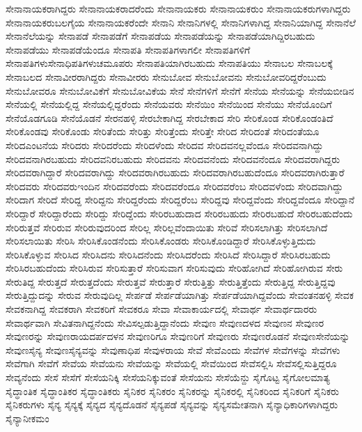 {ಸೇನಾನಾಯಕರಾಗಿದ್ದರು
ಸೇನಾನಾಯಕರಾದರೆಂದು
ಸೇನಾನಾಯಕರು
ಸೇನಾನಾಯಕರುಂ
ಸೇನಾನಾಯಕರುಗಳಾಗಿದ್ದರು
ಸೇನಾನಾಯಕರುಬಲಗೈಯ
ಸೇನಾನಾಯಕರೆಂದೇ
ಸೇನಾನಿ
ಸೇನಾನಿಗಳಲ್ಲಿ
ಸೇನಾನಿಗಳಾಗಿದ್ದ
ಸೇನಾನಿಯಾಗಿದ್ದ
ಸೇನಾನೆಲೆ
ಸೇನಾನೆಲೆಯನ್ನು
ಸೇನಾಪಡೆ
ಸೇನಾಪಡೆಗೆ
ಸೇನಾಪಡೆಯ
ಸೇನಾಪಡೆಯನ್ನು
ಸೇನಾಪಡೆಯಾಗಿದ್ದಿರಬಹುದು
ಸೇನಾಪಡೆಯು
ಸೇನಾಪಡೆಯೆಂದೂ
ಸೇನಾಪತಿ
ಸೇನಾಪತಿಗಳಾಗಲೀ
ಸೇನಾಪತಿಗಳಿಗೆ
ಸೇನಾಪತಿಗಳುಸೇನಾಧಿಪತಿಗಳುಚಮೂಪರು
ಸೇನಾಪತಿಯಾಗಿರಬಹುದು
ಸೇನಾಪತಿಯು
ಸೇನಾಬಲ
ಸೇನಾಬಲಕ್ಕೆ
ಸೇನಾಬಲದ
ಸೇನಾವೀರರಾಗಿದ್ದರು
ಸೇನಾವೀರರು
ಸೇನುಬೋವ
ಸೇನುಬೋವನು
ಸೇನುಬೋವರಿದ್ದರೆಂಬುದು
ಸೇನುಬೋವರೂ
ಸೇನುಬೋವಿಕೆಗೆ
ಸೇನುಬೋವಿಕೆಯ
ಸೇನೆ
ಸೇನೆಗಳಿಗೆ
ಸೇನೆಗೆ
ಸೇನೆಯ
ಸೇನೆಯನ್ನು
ಸೇನೆಯಬೀಡಿನ
ಸೇನೆಯಲ್ಲಿ
ಸೇನೆಯಲ್ಲಿದ್ದ
ಸೇನೆಯಲ್ಲಿದ್ದರೆಂದು
ಸೇನೆಯವರು
ಸೇನೆಯಿಂ
ಸೇನೆಯಿಂದ
ಸೇನೆಯು
ಸೇನೆಯೊಂದಿಗೆ
ಸೇನೆಯೊಡಗೂಡಿ
ಸೇನೆಯೊಡನೆ
ಸೇರನಹಳ್ಳಿ
ಸೇರಬೇಕಾಗಿದ್ದ
ಸೇರಬೇಕಾದ
ಸೇರಿ
ಸೇರಿಕೊಂಡ
ಸೇರಿಕೊಂಡಂತಿದೆ
ಸೇರಿಕೊಂಡವು
ಸೇರಿಕೊಂಡು
ಸೇರಿತೆಂದು
ಸೇರಿತ್ತು
ಸೇರಿತ್ತೆಂದು
ಸೇರಿತ್ತೇ
ಸೇರಿದ
ಸೇರಿದಂತೆ
ಸೇರಿದಂತೆಯೂ
ಸೇರಿದಎಂಟನೆಯ
ಸೇರಿದರು
ಸೇರಿದರೆಂದು
ಸೇರಿದಳೆಂದು
ಸೇರಿದವ
ಸೇರಿದವನಲ್ಲವೆಂದೂ
ಸೇರಿದವನಾಗಿದ್ದು
ಸೇರಿದವನಾಗಿರಬಹುದು
ಸೇರಿದವನಿರಬಹುದು
ಸೇರಿದವನು
ಸೇರಿದವನೆಂದು
ಸೇರಿದವನೆಂದೂ
ಸೇರಿದವರಾಗಿದ್ದರು
ಸೇರಿದವರಾಗಿದ್ದಾರೆ
ಸೇರಿದವರಾಗಿದ್ದು
ಸೇರಿದವರಾಗಿರಬಹುದು
ಸೇರಿದವರಾಗಿರಬಹುದೆಂದೂ
ಸೇರಿದವರಾಗಿರುತ್ತಾರೆ
ಸೇರಿದವರು
ಸೇರಿದವರುಇಂದಿನ
ಸೇರಿದವರೆಂದು
ಸೇರಿದವರೆಂದೂ
ಸೇರಿದವರೆಂಬ
ಸೇರಿದವಳೆಂದು
ಸೇರಿದವಾಗಿದ್ದು
ಸೇರಿದಾಗ
ಸೇರಿದೆ
ಸೇರಿದ್ದ
ಸೇರಿದ್ದನು
ಸೇರಿದ್ದರೆಂದು
ಸೇರಿದ್ದರೆಂಬ
ಸೇರಿದ್ದವು
ಸೇರಿದ್ದವೆಂದು
ಸೇರಿದ್ದವೆಂದೂ
ಸೇರಿದ್ದಾನೆ
ಸೇರಿದ್ದಾರೆ
ಸೇರಿದ್ದಾರೆಂದು
ಸೇರಿದ್ದು
ಸೇರಿದ್ದೆಂದು
ಸೇರಿರಬಹುದಾದ
ಸೇರಿರಬಹುದು
ಸೇರಿರಬಹುದೆ
ಸೇರಿರಬಹುದೆಂದು
ಸೇರಿರುತ್ತವೆ
ಸೇರಿರುವ
ಸೇರಿರುವುದರಿಂದ
ಸೇರಿಲ್ಲ
ಸೇರಿಲ್ಲವೆಂದಾಯಿತು
ಸೇರಿವೆ
ಸೇರಿಸಲಾಗಿತ್ತು
ಸೇರಿಸಲಾಗಿದೆ
ಸೇರಿಸಲಾಯಿತು
ಸೇರಿಸಿ
ಸೇರಿಸಿಕೊಂಡನೆಂದು
ಸೇರಿಸಿಕೊಂಡರು
ಸೇರಿಸಿಕೊಂಡಿದ್ದಾರೆ
ಸೇರಿಸಿಕೊಳ್ಳುತ್ತಿದುದು
ಸೇರಿಸಿಕೊಳ್ಳುವ
ಸೇರಿಸಿದ
ಸೇರಿಸಿದನು
ಸೇರಿಸಿದನೆಂದು
ಸೇರಿಸಿದರೆಂದು
ಸೇರಿಸಿದೆ
ಸೇರಿಸಿದ್ದಾರೆ
ಸೇರಿಸಿರಬಹುದು
ಸೇರಿಸಿರಬಹುದೆಂದು
ಸೇರಿಸಿರುವ
ಸೇರಿಸುತ್ತಾರೆ
ಸೇರಿಸುವಾಗ
ಸೇರಿಸುವುದು
ಸೇರಿಹೋಗಿದೆ
ಸೇರಿಹೋಗಿರುವ
ಸೇರು
ಸೇರುತಿದ್ದ
ಸೇರುತ್ತದೆ
ಸೇರುತ್ತದೆಂದು
ಸೇರುತ್ತವೆ
ಸೇರುತ್ತಾರೆ
ಸೇರುತ್ತಿತ್ತು
ಸೇರುತ್ತಿತ್ತೆಂದು
ಸೇರುತ್ತಿದ್ದ
ಸೇರುತ್ತಿದ್ದವು
ಸೇರುತ್ತಿದ್ದುದನ್ನು
ಸೇರುವ
ಸೇರುವುದಿಲ್ಲ
ಸೇರ್ಪಡೆ
ಸೇರ್ಪಡೆಯಾಗಿತ್ತು
ಸೇರ್ಪಡೆಯಾಗಿದ್ದವೆಂದು
ಸೇವಂತನಹಳ್ಳಿ
ಸೇವಕ
ಸೇವಕನಾಗಿದ್ದ
ಸೇವಕರಾಗಿ
ಸೇವಕರಿಗೆ
ಸೇವಕರೂ
ಸೇವಾ
ಸೇವಾಕಾರ್ಯದಲ್ಲಿ
ಸೇವಾರ್ಥ
ಸೇವಾರ್ಥದಾರರು
ಸೇವಾರ್ಥವಾಗಿ
ಸೇವಿತನಾಗಿದ್ದನೆಂದು
ಸೇವಿಸಲ್ಪಡುತ್ತಿದ್ದಾನೆಂದು
ಸೇವುಣ
ಸೇವುಣದಳದ
ಸೇವುಣನ
ಸೇವುಣರ
ಸೇವುಣರನ್ನು
ಸೇವುಣರಾಯದರ್ಪದಳನ
ಸೇವುಣರಿಗೂ
ಸೇವುಣರಿಗೆ
ಸೇವುಣರು
ಸೇವುಣರೊಡನೆ
ಸೇವುಣಸೇನೆಯನ್ನು
ಸೇವುಣಸೈನ್ಯ
ಸೇವುಣಸೈನ್ಯವನ್ನು
ಸೇವುಣಾಧಿಪ
ಸೇವುಳರಾಯ
ಸೇವೆ
ಸೇವೆಎಂದು
ಸೇವೆಗಳ
ಸೇವೆಗಳನ್ನು
ಸೇವೆಗಳು
ಸೇವೆಗಾಗಿ
ಸೇವೆಗೆ
ಸೇವೆಯ
ಸೇವೆಯನು
ಸೇವೆಯನ್ನು
ಸೇವೆಯಲ್ಲಿ
ಸೇವೆಯಿಂದ
ಸೇವೆಸಲ್ಲಿಸಿ
ಸೇವೆಸಲ್ಲಿಸುತ್ತಿದ್ದರೂ
ಸೇವ್ಯನೆಂದು
ಸೇಸೆ
ಸೇಸೆಗೆ
ಸೇಸೆಯನಿಕ್ಕಿ
ಸೇಸೆಯನಿಕ್ಕುವಂತೆ
ಸೇಸೆಯನು
ಸೇಸೆಯೆನ್ದು
ಸೈಗೊಟ್ಟ
ಸೈಗೋಲಮಾತ್ಯ
ಸೈದ್ಧಾಂತಿಕ
ಸೈದ್ಧಾಂತಿಕರ
ಸೈದ್ಧಾಂತಿಕರು
ಸೈನಿಕರ
ಸೈನಿಕರಂ
ಸೈನಿಕರನ್ನು
ಸೈನಿಕರಲ್ಲಿ
ಸೈನಿಕರಿಂದ
ಸೈನಿಕರಿಗೆ
ಸೈನಿಕರು
ಸೈನಿಕರುಗಳು
ಸೈನ್ಯ
ಸೈನ್ಯಕ್ಕೆ
ಸೈನ್ಯದ
ಸೈನ್ಯದೊಡನೆ
ಸೈನ್ಯಪಡೆ
ಸೈನ್ಯವನ್ನು
ಸೈನ್ಯಸಮೇತನಾಗಿ
ಸೈನ್ಯಾಧಿಕಾರಿಗಳಾಗಿದ್ದರು
ಸೈನ್ಯಾನೀಕಮಂ
}
